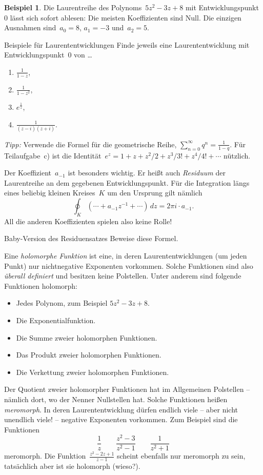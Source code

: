 \documentclass[twoside]{../zirkelblatt1415}
\theoremstyle{definition}
\newtheorem{bsp}[defn]{Beispiel}
\theoremstyle{plain}
\theoremstyle{remark}
\begin{document}
\begin{bsp}Die Laurentreihe des Polynoms~$5 z^2 - 3z + 8$ mit
Entwicklungspunkt~$0$ lässt sich sofort ablesen: Die meisten Koeffizienten sind
Null. Die einzigen Ausnahmen sind~$a_0 = 8$, $a_1 = -3$ und~$a_2 = 5$.\end{bsp}

\begin{aufgabe}{Beispiele für Laurententwicklungen}
Finde jeweils eine Laurententwicklung mit Entwicklungspunkt~$0$ von \ldots
\begin{enumerate}
\item $\frac{1}{1 - z}$,
\item $\frac{1}{1 - z^2}$,
\item $e^{\frac{1}{z}}$,
\item $\frac{1}{(z - i) (z + i)}$.
\end{enumerate}
\emph{Tipp:} Verwende die Formel für die geometrische Reihe, $\sum_{n=0}^\infty
q^n = \frac{1}{1 - q}$. Für Teilaufgabe~c) ist die Identität~$e^z = 1 + z + z^2/2 +
z^3/3! + z^4/4! + \cdots$ nützlich.
\end{aufgabe}

Der Koeffizient~$a_{-1}$ ist besonders wichtig. Er heißt auch \emph{Residuum}
der Laurentreihe an dem gegebenen Entwicklungspunkt. Für die Integration längs
eines beliebig kleinen Kreises~$K$ um den Ursprung gilt nämlich
\[ \oint_K (\cdots + a_{-1} z^{-1} + \cdots) \,dz = 2\pi i \cdot a_{-1}. \]
All die anderen Koeffizienten spielen also keine Rolle!

\begin{aufgabe}{Baby-Version des Residuensatzes}\label{aufg:residuensatz-baby}
Beweise diese Formel.
\end{aufgabe}

Eine \emph{holomorphe Funktion} ist eine, in deren Laurententwicklungen (um
jeden Punkt) nur nichtnegative Exponenten vorkommen. Solche Funktionen sind
also \emph{überall definiert} und besitzen keine Polstellen. Unter anderem sind
folgende Funktionen holomorph:
\begin{itemize}
\item Jedes Polynom, zum Beispiel $5z^2 - 3z + 8$.
\item Die Exponentialfunktion.
\item Die Summe zweier holomorphen Funktionen.
\item Das Produkt zweier holomorphen Funktionen.
\item Die Verkettung zweier holomorphen Funktionen.
\end{itemize}
Der Quotient zweier holomorpher Funktionen hat im Allgemeinen Polstellen
-- nämlich dort, wo der Nenner Nullstellen hat. Solche Funktionen heißen
\emph{meromorph}. In deren Laurententwicklung dürfen endlich viele -- aber
nicht unendlich viele! -- negative Exponenten vorkommen. Zum Beispiel sind die
Funktionen
\[ \frac{1}{z} \qquad \frac{z^2 - 3}{z^2 - 1} \qquad \frac{1}{z^2 + 1} \]
meromorph. Die Funktion~$\frac{z^2 - 2z + 1}{z - 1}$ scheint ebenfalls nur
meromorph zu sein, tatsächlich aber ist sie holomorph (wieso?).
\end{document}
